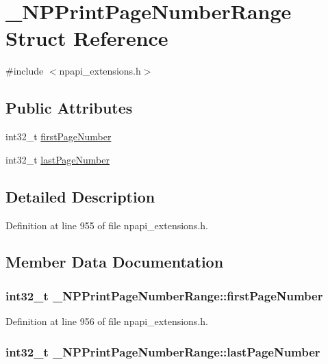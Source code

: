 \hypertarget{struct___n_p_print_page_number_range}{
\section{\_\-NPPrintPageNumberRange Struct Reference}
\label{struct___n_p_print_page_number_range}
}


{\ttfamily \#include $<$npapi\_\-extensions.h$>$}

\subsection*{Public Attributes}
\begin{DoxyCompactItemize}
\item 
int32\_\-t \hyperlink{struct___n_p_print_page_number_range_abd83aaf872131e8400b85b5f20b641e4}{firstPageNumber}
\item 
int32\_\-t \hyperlink{struct___n_p_print_page_number_range_a0b3c9c006c66f2f322cbd8db8fb5b1d8}{lastPageNumber}
\end{DoxyCompactItemize}


\subsection{Detailed Description}


Definition at line 955 of file npapi\_\-extensions.h.



\subsection{Member Data Documentation}
\hypertarget{struct___n_p_print_page_number_range_abd83aaf872131e8400b85b5f20b641e4}{
\subsubsection[{firstPageNumber}]{\setlength{\rightskip}{0pt plus 5cm}int32\_\-t {\bf \_\-NPPrintPageNumberRange::firstPageNumber}}}
\label{struct___n_p_print_page_number_range_abd83aaf872131e8400b85b5f20b641e4}


Definition at line 956 of file npapi\_\-extensions.h.

\hypertarget{struct___n_p_print_page_number_range_a0b3c9c006c66f2f322cbd8db8fb5b1d8}{
\subsubsection[{lastPageNumber}]{\setlength{\rightskip}{0pt plus 5cm}int32\_\-t {\bf \_\-NPPrintPageNumberRange::lastPageNumber}}}
\label{struct___n_p_print_page_number_range_a0b3c9c006c66f2f322cbd8db8fb5b1d8}


